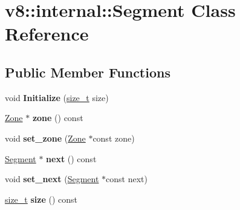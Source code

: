 \hypertarget{classv8_1_1internal_1_1Segment}{}\section{v8\+:\+:internal\+:\+:Segment Class Reference}
\label{classv8_1_1internal_1_1Segment}
\subsection*{Public Member Functions}
\begin{DoxyCompactItemize}
\item 
\mbox{\label{classv8_1_1internal_1_1Segment_a348222c2ad08aaa0a3a4e0386623b8f6}} 
void {\bfseries Initialize} (\mbox{\hyperlink{classsize__t}{size\+\_\+t}} size)
\item 
\mbox{\label{classv8_1_1internal_1_1Segment_a66a3508fb87c3ba6c09d71688bc02911}} 
\mbox{\hyperlink{classv8_1_1internal_1_1Zone}{Zone}} $\ast$ {\bfseries zone} () const
\item 
\mbox{\label{classv8_1_1internal_1_1Segment_ab4851303c0750994872ef72e2e0becd7}} 
void {\bfseries set\+\_\+zone} (\mbox{\hyperlink{classv8_1_1internal_1_1Zone}{Zone}} $\ast$const zone)
\item 
\mbox{\label{classv8_1_1internal_1_1Segment_a750d31234143790cfa950715b9bec9cf}} 
\mbox{\hyperlink{classv8_1_1internal_1_1Segment}{Segment}} $\ast$ {\bfseries next} () const
\item 
\mbox{\label{classv8_1_1internal_1_1Segment_aafd40a351dec49b6d12309af80fbd9f3}} 
void {\bfseries set\+\_\+next} (\mbox{\hyperlink{classv8_1_1internal_1_1Segment}{Segment}} $\ast$const next)
\item 
\mbox{\label{classv8_1_1internal_1_1Segment_a32b7dc63952f4efb472805f7131bddf2}} 
\mbox{\hyperlink{classsize__t}{size\+\_\+t}} {\bfseries size} () const
\item 
\mbox{\label{classv8_1_1internal_1_1Segment_aeb1e48935e1b73a058f6228e6f528ae4}} 

\end{DoxyCompactItemize}
